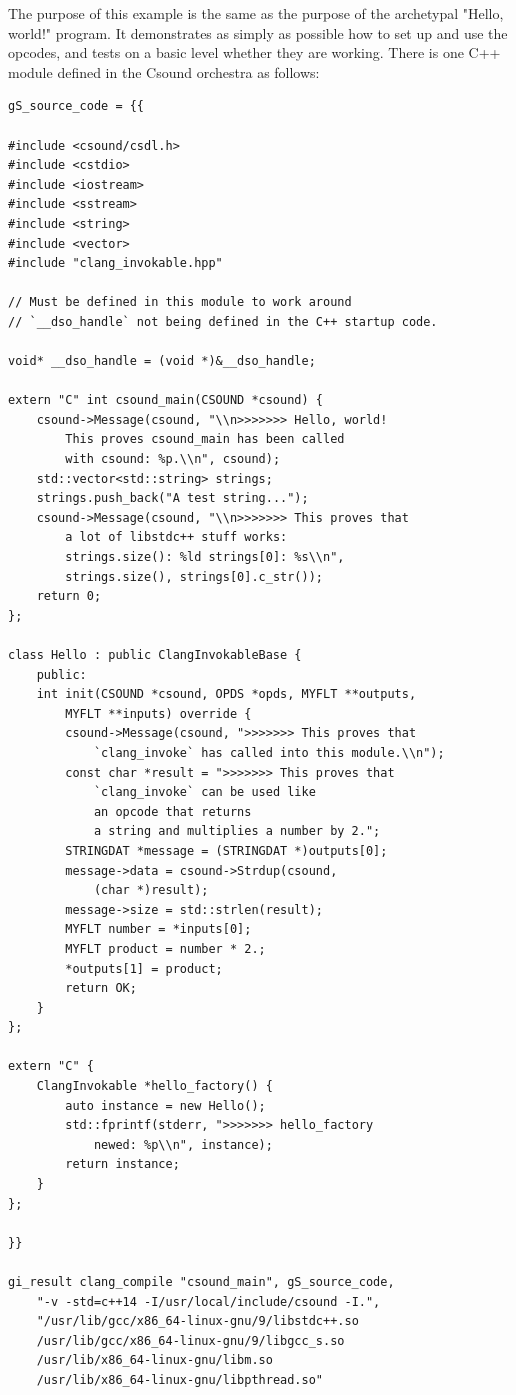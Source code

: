 \documentclass[letterpaper, 12pt]{article}
\begin{document}
The purpose of this example is the same as the purpose of the archetypal "Hello, world!" program. It demonstrates as simply as possible how to set up and use the opcodes, and 
tests on a basic level whether they are working. There is one C++ module defined in the Csound orchestra as follows:

\begin{Verbatim}[fontfamily=courier, xleftmargin=\parindent]
gS_source_code = {{

#include <csound/csdl.h>
#include <cstdio>
#include <iostream>
#include <sstream>
#include <string>
#include <vector>
#include "clang_invokable.hpp"

// Must be defined in this module to work around 
// `__dso_handle` not being defined in the C++ startup code.

void* __dso_handle = (void *)&__dso_handle;

extern "C" int csound_main(CSOUND *csound) {
    csound->Message(csound, "\\n>>>>>>> Hello, world! 
    	This proves csound_main has been called 
    	with csound: %p.\\n", csound);
    std::vector<std::string> strings;
    strings.push_back("A test string...");
    csound->Message(csound, "\\n>>>>>>> This proves that 
    	a lot of libstdc++ stuff works: 
    	strings.size(): %ld strings[0]: %s\\n", 
    	strings.size(), strings[0].c_str());
    return 0;
};

class Hello : public ClangInvokableBase {
    public:
    int init(CSOUND *csound, OPDS *opds, MYFLT **outputs, 
    	MYFLT **inputs) override {
	    csound->Message(csound, ">>>>>>> This proves that 
	    	`clang_invoke` has called into this module.\\n");
	    const char *result = ">>>>>>> This proves that 
	    	`clang_invoke` can be used like 
	    	an opcode that returns 
	    	a string and multiplies a number by 2.";
	    STRINGDAT *message = (STRINGDAT *)outputs[0];
		message->data = csound->Strdup(csound, 
			(char *)result);
        message->size = std::strlen(result);
	    MYFLT number = *inputs[0];
	    MYFLT product = number * 2.;
	    *outputs[1] = product;
        return OK;
    }
};

extern "C" {
	ClangInvokable *hello_factory() {
	    auto instance = new Hello();
	    std::fprintf(stderr, ">>>>>>> hello_factory 
	    	newed: %p\\n", instance);
	    return instance;
	}
};

}}

gi_result clang_compile "csound_main", gS_source_code, 
	"-v -std=c++14 -I/usr/local/include/csound -I.", 
	"/usr/lib/gcc/x86_64-linux-gnu/9/libstdc++.so 
	/usr/lib/gcc/x86_64-linux-gnu/9/libgcc_s.so 
	/usr/lib/x86_64-linux-gnu/libm.so 
	/usr/lib/x86_64-linux-gnu/libpthread.so"
\end{Verbatim}
\end{document}
